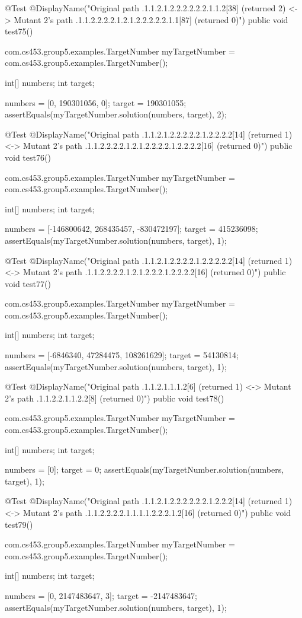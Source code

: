 @Test
@DisplayName("Original path .1.1.2.1.2.2.2.2.2.2.1.1.2[38] (returned 2) <-> Mutant 2's path .1.1.2.2.2.2.1.2.1.2.2.2.2.2.1.1[87] (returned 0)")
public void test75() {
    com.cs453.group5.examples.TargetNumber myTargetNumber = com.cs453.group5.examples.TargetNumber();

    int[] numbers;
    int target;

    numbers = [0, 190301056, 0];
    target = 190301055;
    assertEquals(myTargetNumber.solution(numbers, target), 2);
}

@Test
@DisplayName("Original path .1.1.2.1.2.2.2.2.2.1.2.2.2.2[14] (returned 1) <-> Mutant 2's path .1.1.2.2.2.2.1.2.1.2.2.2.2.1.2.2.2.2[16] (returned 0)")
public void test76() {
    com.cs453.group5.examples.TargetNumber myTargetNumber = com.cs453.group5.examples.TargetNumber();

    int[] numbers;
    int target;

    numbers = [-146800642, 268435457, -830472197];
    target = 415236098;
    assertEquals(myTargetNumber.solution(numbers, target), 1);
}

@Test
@DisplayName("Original path .1.1.2.1.2.2.2.2.1.2.2.2.2.2[14] (returned 1) <-> Mutant 2's path .1.1.2.2.2.2.1.2.1.2.2.2.1.2.2.2.2[16] (returned 0)")
public void test77() {
    com.cs453.group5.examples.TargetNumber myTargetNumber = com.cs453.group5.examples.TargetNumber();

    int[] numbers;
    int target;

    numbers = [-6846340, 47284475, 108261629];
    target = 54130814;
    assertEquals(myTargetNumber.solution(numbers, target), 1);
}

@Test
@DisplayName("Original path .1.1.2.1.1.1.2[6] (returned 1) <-> Mutant 2's path .1.1.2.2.1.1.2.2[8] (returned 0)")
public void test78() {
    com.cs453.group5.examples.TargetNumber myTargetNumber = com.cs453.group5.examples.TargetNumber();

    int[] numbers;
    int target;

    numbers = [0];
    target = 0;
    assertEquals(myTargetNumber.solution(numbers, target), 1);
}

@Test
@DisplayName("Original path .1.1.2.1.2.2.2.2.2.2.1.2.2.2[14] (returned 1) <-> Mutant 2's path .1.1.2.2.2.2.1.1.1.1.2.2.2.1.2[16] (returned 0)")
public void test79() {
    com.cs453.group5.examples.TargetNumber myTargetNumber = com.cs453.group5.examples.TargetNumber();

    int[] numbers;
    int target;

    numbers = [0, 2147483647, 3];
    target = -2147483647;
    assertEquals(myTargetNumber.solution(numbers, target), 1);
}

